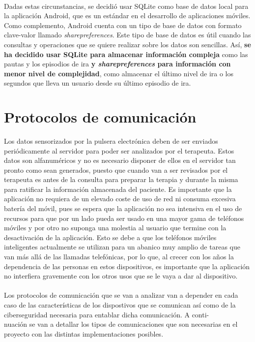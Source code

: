 \paragraph{}
Dadas estas circunstancias, se decidió usar SQLite como base de datos local para la aplicación Android, que es un estándar en el desarrollo de aplicaciones móviles. Como complemento, Android cuenta con un tipo de base de datos con formato clave-valor llamado \textit{sharepreferences}. Este tipo de base de datos es útil cuando las consultas y operaciones que se quiere realizar sobre los datos son sencillas. Así, \textbf{se ha decidido usar SQLite para almacenar información compleja} como las pautas y los episodios de ira \textbf{y \textit{sharepreferences} para información con menor nivel de complejidad}, como almacenar el último nivel de ira o los segundos que lleva un usuario desde su último episodio de ira.

\section{Protocolos de comunicación}
\label{sec:protoCom}
\paragraph{}
Los datos sensorizados por la pulsera electrónica deben de ser enviados periódicamente al servidor para poder ser analizados por el terapeuta. Estos datos son alfanuméricos y no es necesario disponer de ellos en el servidor tan pronto como sean generados, puesto que cuando van a ser revisados por el terapeuta es antes de la consulta para preparar la terapia y durante la misma para ratificar la información almacenada del paciente. Es importante que la aplicación no requiera de un elevado coste de uso de red ni consuma excesiva batería del móvil, pues se espera que la aplicación no sea intensiva en el uso de recursos para que por un lado pueda ser usado en una mayor gama de teléfonos móviles y por otro no suponga una molestia al usuario que termine con la desactivación de la aplicación. Esto se debe a que los teléfonos móviles inteligentes actualmente se utilizan para un abanico muy amplio de tareas que van más allá de las llamadas telefónicas, por lo que, al crecer con los años la dependencia de las personas en estos dispositivos, es importante que la aplicación no interfiera gravemente con los otros usos que se le vaya a dar al dispositivo.

\paragraph{}
Los protocolos de comunicación que se van a analizar van a depender en cada caso de las características de los dispostivos que se comunican así como de la ciberseguridad necesaria para entablar dicha comunicación. A conti-\\nuación se van a detallar los tipos de comunicaciones que son necesarias en el proyecto con las distintas implementaciones posibles.

